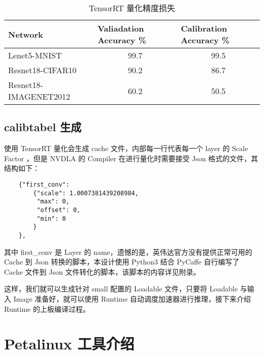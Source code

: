 \begin{table}[!htbp]
    \caption{TensorRT 量化精度损失}
    \label{tab:Qualifications Report}
    \centering
    \footnotesize%
    \setlength{\tabcolsep}{4pt}%
    \renewcommand{\arraystretch}{1.2}%
    \begin{tabular}{lcc}
        \toprule
        \textbf{Network}      & \multicolumn{1}{l}{\textbf{Valiadation Accuracy \%}} & \multicolumn{1}{l}{\textbf{Calibration Accuracy \%}} \\
        \midrule
        Lenet5-MNIST          & 99.7                                                 & 99.5                                                 \\
        Resnet18-CIFAR10      & 90.2                                                 & 86.7                                                 \\
        Resnet18-IMAGENET2012 & 60.2                                                 & 50.5                                                 \\
        \bottomrule                   
    \end{tabular}
\end{table}

\subsection{calibtabel 生成}

使用 TensorRT 量化会生成 cache 文件，内部每一行代表每一个 layer 的 Scale Factor ，但是 NVDLA 的 Compiler 在进行量化时需要接受 Json 格式的文件，其结构如下：

\begin{lstlisting}
    {"first_conv":
        {"scale": 1.0007381439208984,
         "max": 0,
         "offset": 0,
         "min": 0
        }
    },
\end{lstlisting}

其中 first\_conv 是 Layer 的 name，遗憾的是，英伟达官方没有提供正常可用的 Cache 到 Json 转换的脚本，本设计使用 Python3 结合 PyCaffe 自行编写了 Cache 文件到 Json 文件转化的脚本，该脚本的内容详见附录。

这样，我们就可以生成针对 small 配置的 Loadable 文件，只要将 Loadable 与输入 Image 准备好，就可以使用 Runtime 自动调度加速器进行推理，接下来介绍 Runtime 的上板编译过程。

\section{Petalinux 工具介绍}

